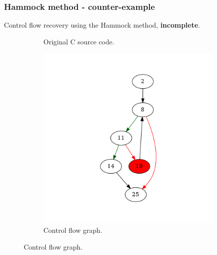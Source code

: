 \documentclass[aspectratio=1610]{beamer}
\begin{document}
\begin{frame}
	\frametitle{Hammock method - counter-example}
	Control flow recovery using the Hammock method, \textbf{incomplete}.
	\begin{figure}[htbp]
		\centering
		\begin{subfigure}[b]{0.30\textwidth}
			\centering
			
			\caption{Original C source code.}
		\end{subfigure}
		\begin{subfigure}[b]{0.50\textwidth}
			\centering
			\includegraphics[height=0.6\paperheight]{inc/methods/hammock/counter-example/with-break/main_0001b.png}
			\caption{Control flow graph.}
		\end{subfigure}
	\end{figure}
\end{frame}

\end{document}
